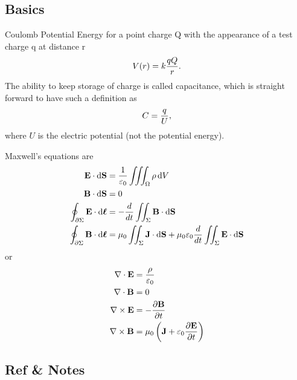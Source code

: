 \documentclass[letterpaper,10pt,english]{sphinxmanual}
\begin{document}
\subsection{Basics}
\label{electrodynamics:basics}
Coulomb Potential Energy for a point charge Q with the appearance of a test charge q at distance r
\begin{gather}
\begin{split}V(r) = k \frac{q Q}{r}.\end{split}\notag
\end{gather}
The ability to keep storage of charge is called capacitance, which is straight forward to have such a definition as
\begin{gather}
\begin{split}C = \frac{q}{U},\end{split}\notag
\end{gather}
where \(U\) is the electric potential (not the potential energy).

Maxwell's equations are
\begin{gather}
\begin{split}\mathbf{E}\cdot\mathrm{d}\mathbf{S} &= \frac{1}{\varepsilon_0} \iiint_\Omega \rho \,\mathrm{d}V \\
\mathbf{B}\cdot\mathrm{d}\mathbf{S} &= 0 \\
\oint_{\partial \Sigma} \mathbf{E} \cdot \mathrm{d}\boldsymbol{\ell} & = - \frac{d}{dt} \iint_{\Sigma} \mathbf{B} \cdot \mathrm{d}\mathbf{S} \\
\oint_{\partial \Sigma} \mathbf{B} \cdot \mathrm{d}\boldsymbol{\ell} &= \mu_0 \iint_{\Sigma} \mathbf{J} \cdot \mathrm{d}\mathbf{S} + \mu_0 \varepsilon_0 \frac{d}{dt} \iint_{\Sigma} \mathbf{E} \cdot \mathrm{d}\mathbf{S}\end{split}\notag
\end{gather}
or
\begin{gather}
\begin{split}\nabla \cdot \mathbf{E} &= \frac {\rho} {\varepsilon_0} \\
\nabla \cdot \mathbf{B} &= 0 \\
\nabla \times \mathbf{E} &= -\frac{\partial \mathbf{B}} {\partial t} \\
\nabla \times \mathbf{B} &= \mu_0\left(\mathbf{J} + \varepsilon_0 \frac{\partial \mathbf{E}} {\partial t} \right)\end{split}\notag
\end{gather}

\subsection{Ref \& Notes}
\label{electrodynamics:ref-notes}
\end{document}
